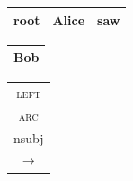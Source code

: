 \documentclass[t]{beamer}
\begin{document}
\begin{frame}
{\begin{varwidth}{1.8\linewidth}
{	\begin{tabular}{|l|l|l|}\hline
	\color{red} root & \color{red} Alice & \color{red} saw \\ \hline
	\end{tabular}
	\hfill
	\begin{tabular}{|l|}\hline
	\color{blue} Bob \\ \hline
	\end{tabular}
	}
	\begin{tabular}{c}\textsc{left}\\ \textsc{arc}\\{\footnotesize nsubj}\\$\rightarrow$\end{tabular}

    \vspace{5mm}
	

\end{varwidth}}
\end{frame}
\end{document}
